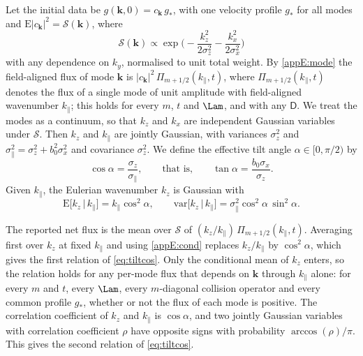 Let the initial data be $g(\boldsymbol k,0)=c_{\boldsymbol k}\,g_*$, with one velocity profile $g_*$ for all modes and $\mathrm E|c_{\boldsymbol k}|^2=\mathcal S(\boldsymbol k)$, where
\begin{equation*}
  \mathcal S(\boldsymbol k)\propto\exp\Big(-\frac{k_z^2}{2\sigma_z^2}-\frac{k_x^2}{2\sigma_x^2}\Big)
\end{equation*}
with any dependence on $k_y$, normalised to unit total weight. By \eqref{appE:mode} the field-aligned flux of mode $\boldsymbol k$ is $|c_{\boldsymbol k}|^2\,\Pi_{m+1/2}(k_\parallel,t)$, where $\Pi_{m+1/2}(k_\parallel,t)$ denotes the flux of a single mode of unit amplitude with field-aligned wavenumber $k_\parallel$; this holds for every $m$, $t$ and $\Lam$, and with any $\mathsf D$. We treat the modes as a continuum, so that $k_z$ and $k_x$ are independent Gaussian variables under $\mathcal S$. Then $k_z$ and $k_\parallel$ are jointly Gaussian, with variances $\sigma_z^2$ and $\sigma_\parallel^2=\sigma_z^2+b_0^2\sigma_x^2$ and covariance $\sigma_z^2$. We define the effective tilt angle $\alpha\in[0,\pi/2)$ by
\begin{equation*}
  \cos\alpha=\frac{\sigma_z}{\sigma_\parallel},\qquad\text{that is,}\qquad \tan\alpha=\frac{b_0\sigma_x}{\sigma_z}.
\end{equation*}
Given $k_\parallel$, the Eulerian wavenumber $k_z$ is Gaussian with
\begin{equation}\label{appE:cond}
  \mathrm E\big[k_z\,\big|\,k_\parallel\big]=k_\parallel\cos^2\alpha,\qquad
  \mathrm{var}\big[k_z\,\big|\,k_\parallel\big]=\sigma_\parallel^2\cos^2\alpha\,\sin^2\alpha .
\end{equation}

The reported net flux is the mean over $\mathcal S$ of $(k_z/k_\parallel)\,\Pi_{m+1/2}(k_\parallel,t)$. Averaging first over $k_z$ at fixed $k_\parallel$ and using \eqref{appE:cond} replaces $k_z/k_\parallel$ by $\cos^2\alpha$, which gives the first relation of \eqref{eq:tiltcos}. Only the conditional mean of $k_z$ enters, so the relation holds for any per-mode flux that depends on $\boldsymbol k$ through $k_\parallel$ alone: for every $m$ and $t$, every $\Lam$, every $m$-diagonal collision operator and every common profile $g_*$, whether or not the flux of each mode is positive. The correlation coefficient of $k_z$ and $k_\parallel$ is $\cos\alpha$, and two jointly Gaussian variables with correlation coefficient $\rho$ have opposite signs with probability $\arccos(\rho)/\pi$. This gives the second relation of \eqref{eq:tiltcos}.


